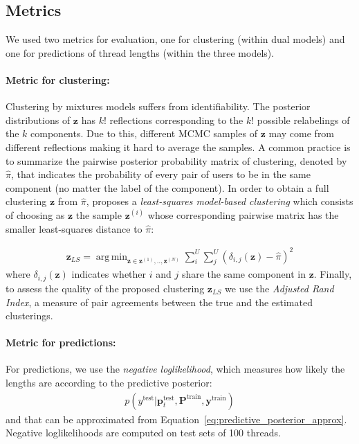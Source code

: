 \documentclass[smallextended]{svjour3}          %
\DeclareMathOperator*{\argmin}{arg\,min}
\begin{document}
\subsection{Metrics}
We used two metrics for evaluation, one for clustering (within dual models) and one for predictions of thread lengths (within the three models). 

\paragraph{Metric for clustering:}
Clustering by mixtures models suffers from identifiability. The posterior distributions of $\mathbf{z}$ has $k!$ reflections corresponding to the $k!$ possible relabelings of the $k$ components. Due to this, different MCMC samples of $\mathbf{z}$ may come from different reflections making it hard to average the samples. A common practice is to summarize the pairwise posterior probability matrix of clustering, denoted by $\hat{\pi}$, that indicates the probability of every pair of users to be in the same component (no matter the label of the component). In order to obtain a full clustering $\mathbf{z}$ from $\hat{\pi}$, \cite{Dahl2006} proposes a \textit{least-squares model-based clustering} which consists of choosing as $\mathbf{z}$ the sample $\mathbf{z}^{(i)}$ whose corresponding pairwise matrix has the smaller least-squares distance to $\hat{\pi}$:

\begin{align}
\mathbf{z}_{LS} = \argmin_{\mathbf{z} \in \mathbf{z}^{(1)},..,\mathbf{z}^{(N)}} \sum_i^U \sum_j^U (\delta_{i,j}(\mathbf{z}) - \hat{\pi})^2
\end{align}
where $\delta_{i,j}(\mathbf{z})$ indicates whether $i$ and $j$ share the same component in $\mathbf{z}$.
Finally, to assess the quality of the proposed clustering $\mathbf{z}_{LS}$ we use the \textit{Adjusted Rand Index}, a measure of pair agreements between the true and the estimated clusterings.

\paragraph{Metric for predictions:}
For predictions, we use the \textit{negative loglikelihood}, 
which measures how likely the lengths are according to the predictive posterior:
\begin{align}
p(y^{\text{test}} | \mathbf{p}_t^{\text{test}}, \mathbf{P}^{\text{train}}, \mathbf{y}^{\text{train}})
\end{align}
and that can be approximated from Equation~\ref{eq:predictive_posterior_approx}. Negative loglikelihoods are computed on test sets of 100 threads.
\end{document}
